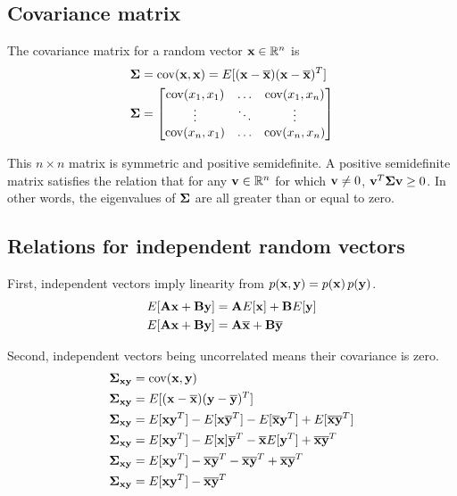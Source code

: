 \subsection{Covariance matrix}

The covariance matrix for a random vector $\mathbf{x} \in \mathbb{R}^n$ is
\begin{align*}
  \mathbf{\Sigma} &= \operatorname{cov}(\mathbf{x}, \mathbf{x}) = E[(\mathbf{x} - \overline{\mathbf{x}})
    (\mathbf{x} - \overline{\mathbf{x}})^T] \\
  \mathbf{\Sigma} &= \begin{bmatrix}
    \operatorname{cov}(x_1, x_1) & \ldots & \operatorname{cov}(x_1, x_n) \\
    \vdots         & \ddots & \vdots \\
    \operatorname{cov}(x_n, x_1) & \ldots & \operatorname{cov}(x_n, x_n) \\
  \end{bmatrix}
\end{align*}

This $n \times n$ matrix is symmetric and positive semidefinite. A positive
semidefinite matrix satisfies the relation that for any
$\mathbf{v} \in \mathbb{R}^n$ for which $\mathbf{v} \neq 0$,
$\mathbf{v}^T \mathbf{\Sigma} \mathbf{v} \geq 0$. In other words, the eigenvalues of
$\mathbf{\Sigma}$ are all greater than or equal to zero.

\subsection{Relations for independent random vectors}

First, independent vectors imply linearity from
$p(\mathbf{x}, \mathbf{y}) = p(\mathbf{x}) \,p(\mathbf{y})$.
\begin{align*}
  E[\mathbf{A}\mathbf{x} + \mathbf{B}\mathbf{y}] &= \mathbf{A}E[\mathbf{x}] + \mathbf{B}E[\mathbf{y}] \\
  E[\mathbf{A}\mathbf{x} + \mathbf{B}\mathbf{y}] &= \mathbf{A}\overline{\mathbf{x}} + \mathbf{B}\overline{\mathbf{y}}
\end{align*}

Second, independent vectors being uncorrelated means their covariance is zero.
\begin{align}
  \mathbf{\Sigma}_{\mathbf{x}\mathbf{y}} &= \operatorname{cov}(\mathbf{x}, \mathbf{y}) \nonumber \\
  \mathbf{\Sigma}_{\mathbf{x}\mathbf{y}} &= E[(\mathbf{x} - \overline{\mathbf{x}})
    (\mathbf{y} - \overline{\mathbf{y}})^T] \nonumber \\
  \mathbf{\Sigma}_{\mathbf{x}\mathbf{y}} &= E[\mathbf{x}\mathbf{y}^T] -
    E[\mathbf{x}\overline{\mathbf{y}}^T] - E[\overline{\mathbf{x}}\mathbf{y}^T] +
    E[\overline{\mathbf{x}}\overline{\mathbf{y}}^T] \nonumber \\
  \mathbf{\Sigma}_{\mathbf{x}\mathbf{y}} &= E[\mathbf{x}\mathbf{y}^T] -
    E[\mathbf{x}]\overline{\mathbf{y}}^T - \overline{\mathbf{x}}E[\mathbf{y}^T] +
    \overline{\mathbf{x}}\overline{\mathbf{y}}^T \nonumber \\
  \mathbf{\Sigma}_{\mathbf{x}\mathbf{y}} &= E[\mathbf{x}\mathbf{y}^T] -
    \overline{\mathbf{x}}\overline{\mathbf{y}}^T - \overline{\mathbf{x}}\overline{\mathbf{y}}^T +
    \overline{\mathbf{x}}\overline{\mathbf{y}}^T \nonumber \\
  \mathbf{\Sigma}_{\mathbf{x}\mathbf{y}} &= E[\mathbf{x}\mathbf{y}^T] -
    \overline{\mathbf{x}}\overline{\mathbf{y}}^T \label{eq:prb_sigma}
\end{align}

